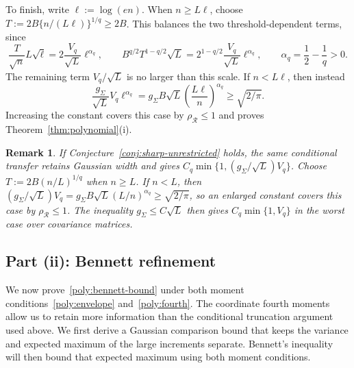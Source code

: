 \documentclass[11pt,letterpaper,twoside,leqno]{article}
\theoremstyle{bookplain}
\theoremstyle{bookremark}
\newtheorem{remark}{Remark}
\newcommand{\rh}{\rho_{\mathcal R}}
\begin{document}
To finish, write $\ell:=\log(en)$. When $n\ge L\ell$, choose
$T:=2B\{n/(L\ell)\}^{1/q}\ge2B$. This balances the two
threshold-dependent terms, since
\[
 \frac{T}{\sqrt n}L\sqrt\ell
   =2\frac{V_q}{\sqrt L}\ell^{\alpha_q},\qquad
 B^{q/2}T^{1-q/2}\sqrt L
   =2^{1-q/2}\frac{V_q}{\sqrt L}\ell^{\alpha_q},
 \qquad \alpha_q=\frac12-\frac1q>0.
\]
The remaining term $V_q/\sqrt L$ is no larger than this scale.
If $n<L\ell$, then instead
\[
 \frac{g_\Sigma}{\sqrt L}V_q\ell^{\alpha_q}
 =g_\Sigma B\sqrt L\left(\frac{L\ell}{n}\right)^{\alpha_q}
 \ge\sqrt{2/\pi}.
\]
Increasing the constant covers this case by $\rh\le1$ and proves
Theorem~\ref{thm:polynomial}\textup{(i)}.

\begin{remark}\label{rmk:E1}
If Conjecture~\ref{conj:sharp-unrestricted} holds, the same
conditional transfer retains Gaussian width and gives
$C_q\min\{1,(g_\Sigma/\sqrt L)V_q\}$. Choose
$T:=2B(n/L)^{1/q}$ when $n\ge L$. If $n<L$, then
$(g_\Sigma/\sqrt L)V_q
=g_\Sigma B\sqrt L(L/n)^{\alpha_q}\ge\sqrt{2/\pi}$,
so an enlarged constant covers this case by $\rh\le1$.
The inequality $g_\Sigma\le C\sqrt L$ then gives
$C_q\min\{1,V_q\}$ in the worst case over covariance matrices.
\end{remark}

\subsection{\texorpdfstring{{Part (ii): Bennett refinement}}{Part (ii): Bennett refinement}}\label{app:bennett}

We now prove~\eqref{poly:bennett-bound} under both moment
conditions~\eqref{poly:envelope} and~\eqref{poly:fourth}. The
coordinate fourth moments allow us to retain more information than
the conditional truncation argument used above. We first derive a
Gaussian comparison bound that keeps the variance and expected
maximum of the large increments separate. Bennett's inequality
will then bound that expected maximum using both moment conditions.
\end{document}
